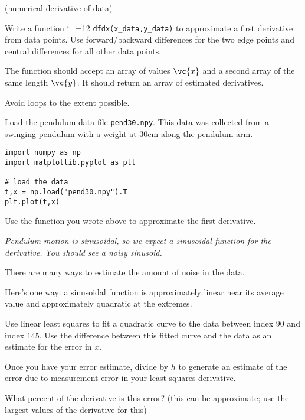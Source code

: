 \documentclass[12pt,letterpaper,noanswers]{exam}
\makeatletter
\newcommand{\pyf}{%
  \begingroup\catcode`_=12
  \pyf@
}
\newcommand{\pyf@}[1]{\texttt{#1}\endgroup}
\makeatother
\begin{document}
\begin{questions}
\question (numerical derivative of data)
\begin{parts}
\item Write a function \pyf{dfdx(x_data,y_data)} to approximate a first derivative from data points.  Use forward/backward differences for the two edge points and central differences for all other data points.

The function should accept an array of values $\vc{x}$ and a second array of the same length $\vc{y}$.  It should return an array of estimated derivatives.  



Avoid loops to the extent possible.


\item Load the pendulum data file \texttt{pend30.npy}.  This data was collected from a swinging pendulum with a weight at 30cm along the pendulum arm.
\begin{verbatim}
import numpy as np
import matplotlib.pyplot as plt

# load the data
t,x = np.load("pend30.npy").T
plt.plot(t,x)
\end{verbatim}

Use the function you wrote above to approximate the first derivative.

\emph{Pendulum motion is sinusoidal, so we expect a sinusoidal function for the derivative.  You should see a noisy sinusoid.}

\item There are many ways to estimate the amount of noise in the data.  

Here's one way: a sinusoidal function is approximately linear near its average value and approximately quadratic at the extremes.  

Use linear least squares to fit a quadratic curve to the data between index $90$ and index $145$.  Use the difference between this fitted curve and the data as an estimate for the error in $x$.

Once you have your error estimate, divide by $h$ to generate an estimate of the  error due to measurement error in your least squares derivative.

What percent of the derivative is this error? (this can be approximate; use the largest values of the derivative for this)






\end{parts}
\end{questions}
\end{document}
